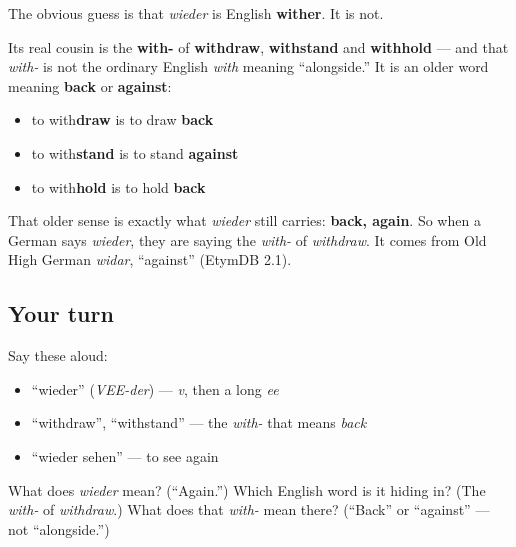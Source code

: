 \begin{cousinweb}
The obvious guess is that \emph{wieder} is English \textbf{wither}. It is not.

Its real cousin is the \textbf{with-} of \textbf{withdraw}, \textbf{withstand} and \textbf{withhold} — and that \emph{with-} is not the ordinary English \emph{with} meaning \textquotedblleft{}alongside.\textquotedblright{} It is an older word meaning \textbf{back} or \textbf{against}:

\begin{itemize}
\raggedright
  \item to with\textbf{draw} is to draw \textbf{back}
  \item to with\textbf{stand} is to stand \textbf{against}
  \item to with\textbf{hold} is to hold \textbf{back}
\end{itemize}

That older sense is exactly what \emph{wieder} still carries: \textbf{back, again}. So when a German says \emph{wieder}, they are saying the \emph{with-} of \emph{withdraw}. It comes from Old High German \emph{widar}, \textquotedblleft{}against\textquotedblright{} (EtymDB 2.1).
\end{cousinweb}

\subsection*{Your turn}
Say these aloud:

\begin{itemize}
\raggedright
  \item \textquotedblleft{}wieder\textquotedblright{} (\emph{VEE-der}) — \emph{v}, then a long \emph{ee}
  \item \textquotedblleft{}withdraw\textquotedblright{}, \textquotedblleft{}withstand\textquotedblright{} — the \emph{with-} that means \emph{back}
  \item \textquotedblleft{}wieder sehen\textquotedblright{} — to see again
\end{itemize}

\begin{tcolorbox}[breakable,colback=teal!4,colframe=teal!35!black,title={Before you move on}]
What does \emph{wieder} mean? (\textquotedblleft{}Again.\textquotedblright{}) Which English word is it hiding in? (The \emph{with-} of \emph{withdraw}.) What does that \emph{with-} mean there? (\textquotedblleft{}Back\textquotedblright{} or \textquotedblleft{}against\textquotedblright{} — not \textquotedblleft{}alongside.\textquotedblright{})
\end{tcolorbox}
